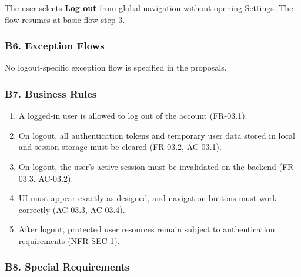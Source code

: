 \documentclass[12pt]{article}
\begin{document}
The user selects \textbf{Log out} from global navigation without opening Settings. The flow resumes at basic flow step 3.
\par\medskip

\hypertarget{sec:b6-exception-flows}{}
\subsubsection*{B6. Exception Flows}
\par\medskip

No logout-specific exception flow is specified in the proposals.
\par\medskip

\hypertarget{sec:b7-business-rules}{}
\subsubsection*{B7. Business Rules}
\par\medskip

\begin{enumerate}
\item A logged-in user is allowed to log out of the account (FR-03.1).
\item On logout, all authentication tokens and temporary user data stored in local and session storage must be cleared (FR-03.2, AC-03.1).
\item On logout, the user's active session must be invalidated on the backend (FR-03.3, AC-03.2).
\item UI must appear exactly as designed, and navigation buttons must work correctly (AC-03.3, AC-03.4).
\item After logout, protected user resources remain subject to authentication requirements (NFR-SEC-1).
\end{enumerate}
\par\medskip

\hypertarget{sec:b8-special-requirements}{}
\subsubsection*{B8. Special Requirements}
\par\medskip
\end{document}
